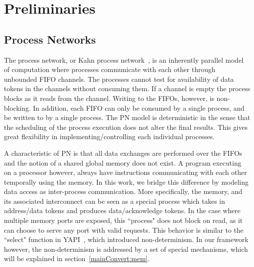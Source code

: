 \documentclass{sig-alternate}
\begin{document}
\section{Preliminaries}
\label{pre}

\subsection{Process Networks}
\label{pre1}
The process network, or Kahn process network~\cite{gilles1974semantics}, is an inherently
parallel model of computation where processes communicate with
each other through unbounded FIFO channels. 
The processes cannot test for availability of data tokens in 
the channels without consuming them. If a channel is empty
the process blocks as it reads from the channel.
Writing to the FIFOs, however, is non-blocking.
In addition, each FIFO can only be consumed by a single process, and be written to by a single process. The PN model is deterministic in the sense that the scheduling of
the process execution does not alter the final results. This gives great flexibility
in implementing/controlling each individual processes. 

A characteristic of PN is that all data exchanges are performed over the FIFOs and the notion of a shared global memory does not exist. A program executing on 
a processor however, always have instructions communicating with each other temporally using
the memory. In this work, we bridge this difference by modeling data access as inter-process communication.
More specifically, the memory, and its associated interconnect can be seen as a special process which takes in address/data tokens and produces data/acknowledge tokens. In the case where multiple memory ports are exposed, this ``process" does not block on read, as it can choose to serve any port with valid
requests. This behavior is similar to the ``select" function in YAPI~\cite{Kock00yapi:application}, which introduced non-determinism. In our framework however, the non-determinism is addressed by a set of special mechanisms, which will be explained in section~\ref{mainConvert:mem}.
\end{document}
